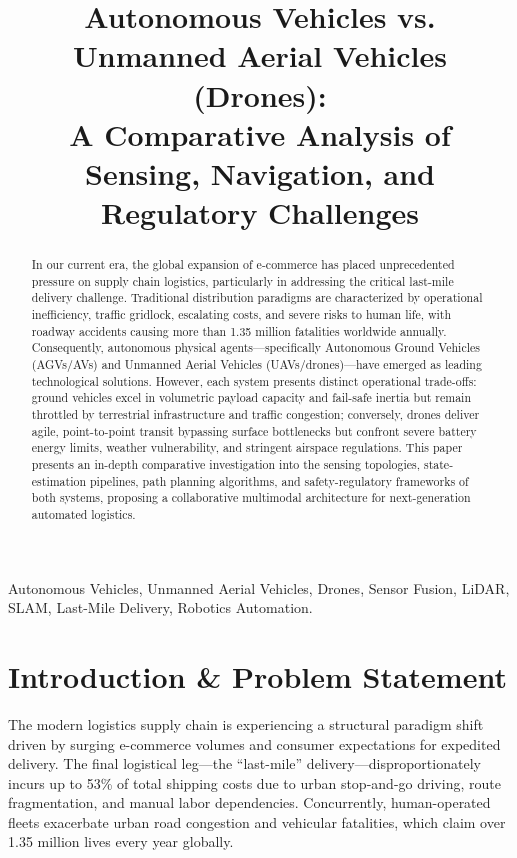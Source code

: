 \documentclass[conference,10pt]{IEEEtran}
\begin{document}
\title{Autonomous Vehicles vs. Unmanned Aerial Vehicles (Drones):\\A Comparative Analysis of Sensing, Navigation, and Regulatory Challenges}

\author{
}

\maketitle

\begin{abstract}
In our current era, the global expansion of e-commerce has placed unprecedented pressure on supply chain logistics, particularly in addressing the critical last-mile delivery challenge. Traditional distribution paradigms are characterized by operational inefficiency, traffic gridlock, escalating costs, and severe risks to human life, with roadway accidents causing more than 1.35 million fatalities worldwide annually. Consequently, autonomous physical agents—specifically Autonomous Ground Vehicles (AGVs/AVs) and Unmanned Aerial Vehicles (UAVs/drones)—have emerged as leading technological solutions. However, each system presents distinct operational trade-offs: ground vehicles excel in volumetric payload capacity and fail-safe inertia but remain throttled by terrestrial infrastructure and traffic congestion; conversely, drones deliver agile, point-to-point transit bypassing surface bottlenecks but confront severe battery energy limits, weather vulnerability, and stringent airspace regulations. This paper presents an in-depth comparative investigation into the sensing topologies, state-estimation pipelines, path planning algorithms, and safety-regulatory frameworks of both systems, proposing a collaborative multimodal architecture for next-generation automated logistics.
\end{abstract}

\begin{IEEEkeywords}
Autonomous Vehicles, Unmanned Aerial Vehicles, Drones, Sensor Fusion, LiDAR, SLAM, Last-Mile Delivery, Robotics Automation.
\end{IEEEkeywords}

\section{Introduction \& Problem Statement}
The modern logistics supply chain is experiencing a structural paradigm shift driven by surging e-commerce volumes and consumer expectations for expedited delivery. The final logistical leg—the ``last-mile'' delivery—disproportionately incurs up to 53\% of total shipping costs due to urban stop-and-go driving, route fragmentation, and manual labor dependencies. Concurrently, human-operated fleets exacerbate urban road congestion and vehicular fatalities, which claim over 1.35 million lives every year globally.
\end{document}
